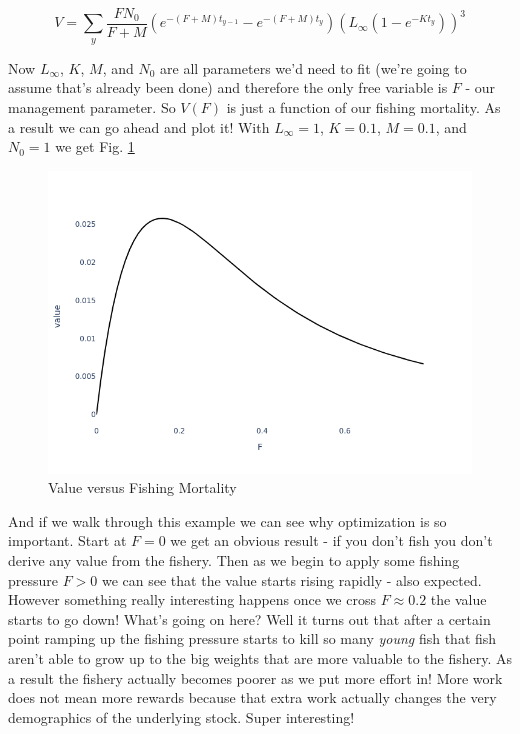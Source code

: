 \documentclass[11pt,a5paper]{book}
\begin{document}
$$V = \sum_y \frac{FN_0}{F+M}(e^{-(F+M)t_{y-1}}- e^{-(F+M)t_y})(L_{\infty}(1-e^{-Kt_y}))^3$$

Now $L_\infty$, $K$, $M$, and $N_0$ are all parameters we'd need to fit (we're going to assume that's already been done) and therefore the only free variable is $F$ - our management parameter. So $V(F)$ is just a function of our fishing mortality. As a result we can go ahead and plot it! With $L_\infty=1$, $K=0.1$, $M=0.1$, and $N_0=1$ we get Fig. \ref{fig:value_v_F}
\newline

\begin{figure}[h!] 
  \includegraphics[width=\linewidth]{notebooks/SimpleOptimization/value_v_F.png}
  \caption{Value versus Fishing Mortality}
  \label{fig:value_v_F}
\end{figure}

And if we walk through this example we can see why optimization is so important. Start at $F=0$ we get an obvious result - if you don't fish you don't derive any value from the fishery. Then as we begin to apply some fishing pressure $F>0$ we can see that the value starts rising rapidly - also expected. However something really interesting happens once we cross $F\approx 0.2$ the value starts to go down! What's going on here? Well it turns out that after a certain point ramping up the fishing pressure starts to kill so many \textit{young} fish that fish aren't able to grow up to the big weights that are more valuable to the fishery. As a result the fishery actually becomes poorer as we put more effort in! More work does not mean more rewards because that extra work actually changes the very demographics of the underlying stock. Super interesting! 
\newline
\end{document}
